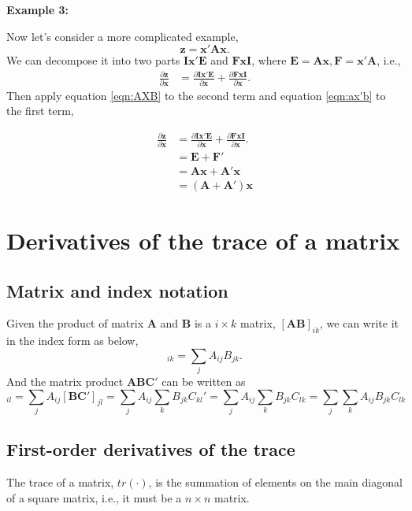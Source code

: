 \documentclass[10pt]{article}
\begin{document}
{\textbf {Example 3:}}

Now let's consider a more complicated example,
\begin{equation*}
\bm{z} = \bm{x}'\bm{Ax}.
\end{equation*}
We can decompose it into two parts $ \bm{Ix}'\bm{E} $ and $ \bm{FxI} $,
where $ \bm{E} = \bm{Ax}, \bm{F} = \bm{x}'\bm{A} $, i.e., 
\begin{align*}
\frac{\partial \bm{z} }{\partial \bm{x} } &=  
\frac{\partial \bm{Ix}'\bm{E} }{\partial \bm{x} } + \frac{\partial \bm{FxI} }{\partial \bm{x} }.
\end{align*}
Then apply equation \eqref{eqn:AXB} to the second term and 
equation \eqref{eqn:ax'b} to the first term,

\begin{align*}
\frac{\partial \bm{z} }{\partial \bm{x} } &=  
\frac{\partial \bm{Ix}'\bm{E} }{\partial \bm{x} } + \frac{\partial \bm{FxI} }{\partial \bm{x} }.\\
&= \bm{E} + \bm{F}'\\
&= \bm{Ax} + \bm{A}'\bm{x}\\
&= (\bm{A} + \bm{A}')\bm{x}
\end{align*}









\section{Derivatives of the trace of a matrix}
\subsection{Matrix and index notation}
Given the product of matrix $ \bm{A} $ and $ \bm{B} $ is
a $ i  \times k $ matrix, $ [ \bm{AB}]_{ik} $,
we can write it in the index form as below,
\begin{equation}
		[\bm{AB}]_{ik} = \sum\limits_{j}A_{ij}B_{jk}.
\end{equation}
And the matrix product $ \bm{ABC}' $ can be written as
\begin{equation}
[\bm{ABC}']_{il} = \sum\limits_{j}A_{ij}[\bm{BC}']_{jl}
=\sum\limits_{j}A_{ij} \sum\limits_{k}B_{jk}C_{kl}'
=\sum\limits_{j}A_{ij} \sum\limits_{k}B_{jk}C_{lk}
=\sum\limits_{j} \sum\limits_{k}A_{ij}B_{jk}C_{lk}
\end{equation}


\subsection{First-order derivatives of the trace}
The trace of a matrix, $ tr(\cdot ) $, is the summation
of elements on the main diagonal of a square matrix,
i.e., it must be a $ n  \times  n $ matrix.
\end{document}
